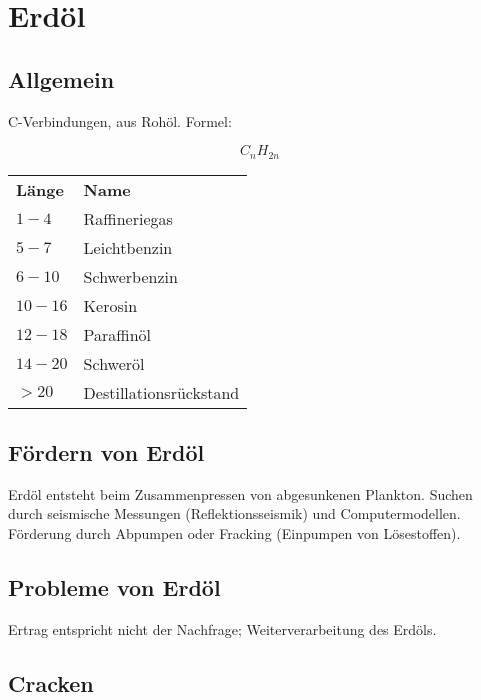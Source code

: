 \section{Erdöl}

\subsection{Allgemein}

\begin{definition}[Erdöl]
	C-Verbindungen, aus Rohöl. Formel:
	
{\large
	\begin{equation}
		C_{n}H_{2n}		
	\end{equation}
}

\begin{center}
	\begin{tabular}{ l  l }
		\textbf{Länge} & \textbf{Name} \\
		$1-4$ & Raffineriegas \\
		$5-7$ & Leichtbenzin \\
		$6-10$ & Schwerbenzin \\
		$10-16$ & Kerosin \\
		$12-18$ & Paraffinöl \\
		$14-20$ & Schweröl \\
		$>20$ & Destillationsrückstand
	\end{tabular}
\end{center}
\end{definition}

\subsection{Fördern von Erdöl}

Erdöl entsteht beim Zusammenpressen von abgesunkenen Plankton. Suchen durch seismische Messungen (Reflektionsseismik) und Computermodellen. Förderung durch Abpumpen oder Fracking (Einpumpen von Lösestoffen).

\subsection{Probleme von Erdöl}

Ertrag entspricht nicht der Nachfrage; Weiterverarbeitung des Erdöls.

\subsection{Cracken}


